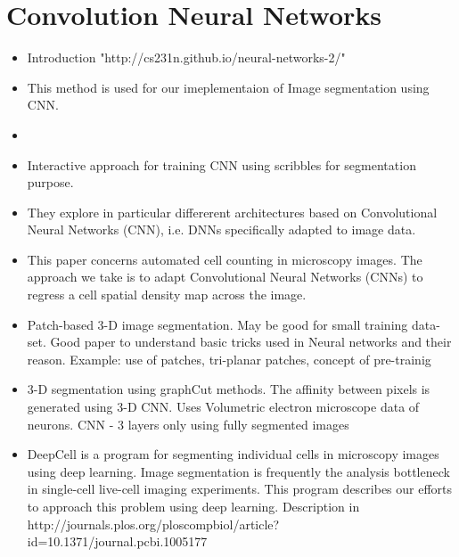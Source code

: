 \documentclass{article}
\begin{document}
\section{Convolution Neural Networks}

\begin{itemize}

\item Introduction \newline
"http://cs231n.github.io/neural-networks-2/"

\item {}
This method is used for our imeplementaion of Image segmentation using CNN.

\item {}

\item {}
Interactive approach for training CNN using scribbles for segmentation purpose.

\item {}
They explore in particular differerent architectures based on Convolutional Neural Networks (CNN), i.e. DNNs specifically adapted to image data. 

\item {}
This paper concerns automated cell counting in microscopy images. The approach we take is to adapt Convolutional Neural Networks (CNNs) to regress a cell spatial density map across the image.


\item {}
Patch-based 3-D image segmentation. May be good for small training data-set. Good paper to understand basic tricks used in Neural networks and their reason.
Example: use of patches, tri-planar patches, concept of pre-trainig

\item {}
3-D segmentation using graphCut methods. The affinity between pixels is generated using 3-D CNN. Uses Volumetric electron microscope data of neurons.
CNN - 3 layers only using fully segmented images 

\item {}
DeepCell is a program for segmenting individual cells in microscopy images using deep learning. Image segmentation is frequently the analysis bottleneck in single-cell live-cell imaging experiments. This program describes our efforts to approach this problem using deep learning. 
Description in 
http://journals.plos.org/ploscompbiol/article?id=10.1371/journal.pcbi.1005177


\end{itemize}
\end{document}

